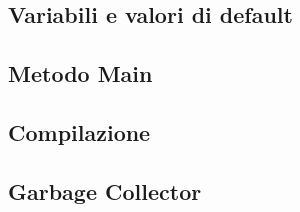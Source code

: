 \documentclass{subfiles}
\begin{document}
\clearpage

\subsection{Variabili e valori di default}


\subsection{Metodo Main}


\subsection{Compilazione}


\subsection{Garbage Collector}

\end{document}
